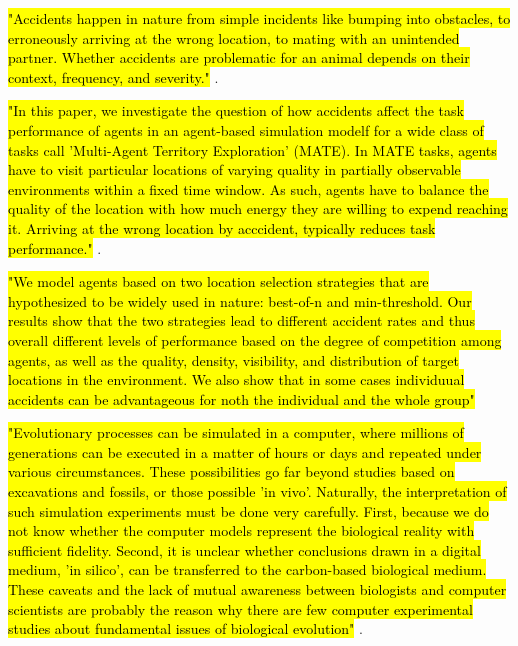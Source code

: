 


\hl{"Accidents happen in nature from simple incidents like bumping into obstacles, to erroneously arriving at the wrong location, to mating with an unintended partner. Whether accidents are problematic for an animal depends on their context, frequency, and severity."} \cite{ferreira2018accidental}.

\hl{"In this paper, we investigate the question of how accidents affect the task performance of agents in an agent-based simulation modelf for a wide class of tasks call 'Multi-Agent Territory Exploration' (MATE). In MATE tasks, agents have to visit particular locations of varying quality in partially observable environments within a fixed time window. As such, agents have to balance the quality of the location with how much energy they are willing to expend reaching it. Arriving at the wrong location by acccident, typically reduces task performance."} \cite{ferreira2018accidental}.

\hl{"We model agents based on two location selection strategies that are hypothesized to be widely used in nature: best-of-n and min-threshold. Our results show that the two strategies lead to different accident rates and thus overall different levels of performance based on the degree of competition among agents, as well as the quality, density, visibility, and distribution of target locations in the environment. We also show that in some cases individuual accidents can  be advantageous for noth the individual and the whole group"} \cite{ferreira2018accidental}



\hl{"Evolutionary processes can be simulated in a computer, where millions of generations can be executed in a matter of hours or days and repeated under various circumstances. These possibilities go far beyond studies based on excavations and fossils, or those possible 'in vivo'. Naturally, the interpretation of such simulation experiments must be done very carefully. First, because we do not know whether the computer models represent the biological reality with sufficient fidelity. Second, it is unclear whether conclusions drawn in a digital medium, 'in silico', can be transferred to the carbon-based biological medium. These caveats and the lack of mutual awareness between biologists and computer scientists are probably the reason why there are few computer experimental studies about fundamental issues of biological evolution"} \cite{EibenSmith2003}.




